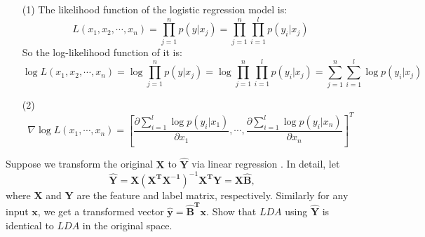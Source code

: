 \begin{solution}
\begin{enumerate}
            \item[(1)] The likelihood function of the logistic regression model is:
                \[L(x_{1},x_{2},\cdots,x_{n})=\prod_{j=1}^{n}p(y|x_{j})=\prod_{j=1}^{n}\prod_{i=1}^{l}p(y_{i}|x_{j})\]
                So the log-likelihood function of it is:
                \[\log{L(x_{1},x_{2},\cdots,x_{n})}=\log{\prod_{j=1}^{n}p(y|x_{j})}=\log{\prod_{j=1}^{n}\prod_{i=1}^{l}p(y_{i}|x_{j})}=\sum_{j=1}^{n}\sum_{i=1}^{l}\log{p(y_{i}|x_{j})}\]
            \item[(2)]
                \[\nabla \log L(x_{1},\cdots,x_{n})=[\frac{\partial{\sum_{i=1}^{l}\log p(y_{i}|x_{1})}}{\partial{x_{1}}},\cdots,\frac{\partial{\sum_{i=1}^{l}\log p(y_{i}|x_{n})}}{\partial{x_{n}}}]^{T}\]
        \end{enumerate}
    \end{solution}
    \begin{problem}
        Suppose we transform the original $\mathbf{X}$ to $\mathbf{\hat{Y}}$ via linear regression . In detail, let
        \[\mathbf{\hat{Y}} = \mathbf{X}(\mathbf{X^{T}}\mathbf{X^{-1}})^{-1}\mathbf{X^{T}}\mathbf{Y} = \mathbf{X}\mathbf{\hat{B}},\]
        where $\mathbf{X}$ and $\mathbf{Y}$ are the feature and label matrix, respectively. Similarly for any input $\mathbf{x}$, we get a transformed vector $\mathbf{\hat{y}}= \mathbf{\hat{B}^{T}}\mathbf{x}$. Show that $LDA$ using $\mathbf{\hat{Y}}$ is identical to $LDA$ in the original space.
    \end{problem}



